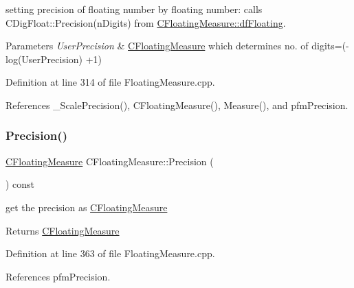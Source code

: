 setting precision of floating number by floating number\+: calls C\+Dig\+Float\+::\+Precision(n\+Digits) from \hyperlink{classCFloatingMeasure_aa0cec9966c6c08db75c493e44396cfc2}{C\+Floating\+Measure\+::df\+Floating}. 


\begin{DoxyParams}{Parameters}
{\em User\+Precision} & \hyperlink{classCFloatingMeasure}{C\+Floating\+Measure} which determines no. of digits=(-\/log(User\+Precision) +1) \\
\hline
\end{DoxyParams}


Definition at line 314 of file Floating\+Measure.\+cpp.



References \+\_\+\+Scale\+Precision(), C\+Floating\+Measure(), Measure(), and pfm\+Precision.

\mbox{\label{classCFloatingMeasure_ac8975daf37b98b3e996893e0de43c4eb}} 
\subsubsection{\texorpdfstring{Precision()}{Precision()}\hspace{0.1cm}{\footnotesize\ttfamily [2/2]}}
{\footnotesize\ttfamily \hyperlink{classCFloatingMeasure}{C\+Floating\+Measure} C\+Floating\+Measure\+::\+Precision (\begin{DoxyParamCaption}{ }\end{DoxyParamCaption}) const}



get the precision as \hyperlink{classCFloatingMeasure}{C\+Floating\+Measure} 

\begin{DoxyReturn}{Returns}
\hyperlink{classCFloatingMeasure}{C\+Floating\+Measure} 
\end{DoxyReturn}


Definition at line 363 of file Floating\+Measure.\+cpp.



References pfm\+Precision.

\mbox{\label{classCFloatingMeasure_a4fe4d60589da6d4c7f09cb09fbea730b}} 
